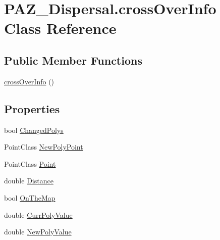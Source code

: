 \hypertarget{class_p_a_z___dispersal_1_1cross_over_info}{\section{P\-A\-Z\-\_\-\-Dispersal.\-cross\-Over\-Info Class Reference}
\label{class_p_a_z___dispersal_1_1cross_over_info}
}
\subsection*{Public Member Functions}
\begin{DoxyCompactItemize}
\item 
\hyperlink{class_p_a_z___dispersal_1_1cross_over_info_a54bdff8abb2fc6561a911ce7193d6d5d}{cross\-Over\-Info} ()
\end{DoxyCompactItemize}
\subsection*{Properties}
\begin{DoxyCompactItemize}
\item 
bool \hyperlink{class_p_a_z___dispersal_1_1cross_over_info_a9f6453e7636999e6bdd2372f2f2846cb}{Changed\-Polys}
\item 
Point\-Class \hyperlink{class_p_a_z___dispersal_1_1cross_over_info_ad2ef1811387d9f75d07d5def2c22ecbc}{New\-Poly\-Point}
\item 
Point\-Class \hyperlink{class_p_a_z___dispersal_1_1cross_over_info_a917f552ee64421422e1883dea11be3c0}{Point}
\item 
double \hyperlink{class_p_a_z___dispersal_1_1cross_over_info_a8bb5dd8d27dcd0bedee508f3771b0e19}{Distance}
\item 
bool \hyperlink{class_p_a_z___dispersal_1_1cross_over_info_a2d0a4f4ceb5869c211daa30d6229918c}{On\-The\-Map}
\item 
double \hyperlink{class_p_a_z___dispersal_1_1cross_over_info_ac8db3de675bfda6988e9fb3ffc60ca16}{Curr\-Poly\-Value}
\item 
double \hyperlink{class_p_a_z___dispersal_1_1cross_over_info_a10877a3be09103990f81b2d80bff03d9}{New\-Poly\-Value}
\end{DoxyCompactItemize}


